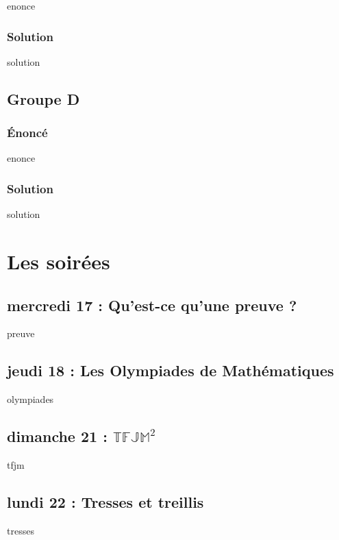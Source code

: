 \documentclass[12pt,A4]{book}
\theoremstyle{definition}
\theoremstyle{thm}
\theoremstyle{def}
\newcounter{sol}[subsection]
\newcommand\TFJM{\mathbb{T}\mathbb{F}\mathbb{J}\mathbb{M}^2}
\begin{document}
{enonce}

\subsection{Solution}

{solution}



\section{Groupe D}

\subsection{Énoncé}

{enonce}

\subsection{Solution}

{solution}


\chapter{Les soirées}
\minitoc \bigskip


\section{mercredi 17 : Qu'est-ce qu'une preuve ?}

{preuve}



\section{jeudi 18 : Les Olympiades de Mathématiques}

{olympiades}

\section{dimanche 21 : $\TFJM$}

{tfjm}

\section{lundi 22 : Tresses et treillis}
{tresses}
\end{document}
